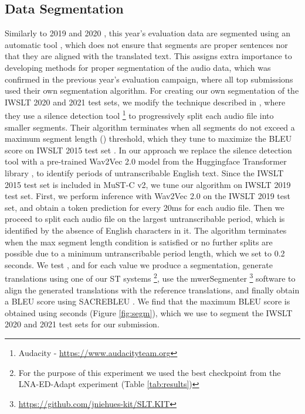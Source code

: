 \documentclass[11pt,a4paper]{article}
\begin{document}
    \subsection{Data Segmentation}
    \label{sec:segm}
        Similarly to 2019 and 2020 \cite{iwslt2019,iwslt2020}, this year's evaluation data are segmented using an automatic tool \cite{lium}, which does not ensure that segments are proper sentences nor that they are aligned with the translated text. This assigns extra importance to developing methods for proper segmentation of the audio data, which was confirmed in the previous year's evaluation campaign, where all top submissions used their own segmentation algorithm. For creating our own segmentation of the IWSLT 2020 and 2021 test sets, we modify the technique described in \citet{srpol2019}, where they use a silence detection tool \footnote{Audacity - \url{https://www.audacityteam.org}} to progressively split each audio file into smaller segments. Their algorithm terminates when all segments do not exceed a maximum segment length () threshold, which they tune to maximize the BLEU score on IWSLT 2015 test set \cite{iwslt2015}. In our approach we replace the silence detection tool with a pre-trained Wav2Vec 2.0 model \cite{wav2vec2.0} from the Huggingface Transformer library \cite{transformers}, to identify periods of untranscribable English text. Since the IWSLT 2015 test set is included in MuST-C v2, we tune our algorithm on IWSLT 2019 test set. First, we perform inference with Wav2Vec 2.0 on the IWSLT 2019 test set, and obtain a token prediction for every 20ms for each audio file. Then we proceed to split each audio file on the largest untranscribable period, which is identified by the absence of English characters in it. The algorithm terminates when the max segment length condition is satisfied or no further splits are possible due to a minimum untranscribable period length, which we set to 0.2 seconds. We test , and for each value we produce a segmentation, generate translations using one of our ST systems \footnote{For the purpose of this experiment we used the best checkpoint from the LNA-ED-Adapt experiment (Table \ref{tab:results})}, use the mwerSegmenter \footnote{\url{https://github.com/jniehues-kit/SLT.KIT}} software to align the generated translations with the reference translations, and finally obtain a BLEU score using SACREBLEU \cite{sacrebleu}. We find that the maximum BLEU score is obtained using   seconds (Figure \ref{fig:segm}), which we use to segment the IWSLT 2020 and 2021 test sets for our submission.
        
\end{document}
